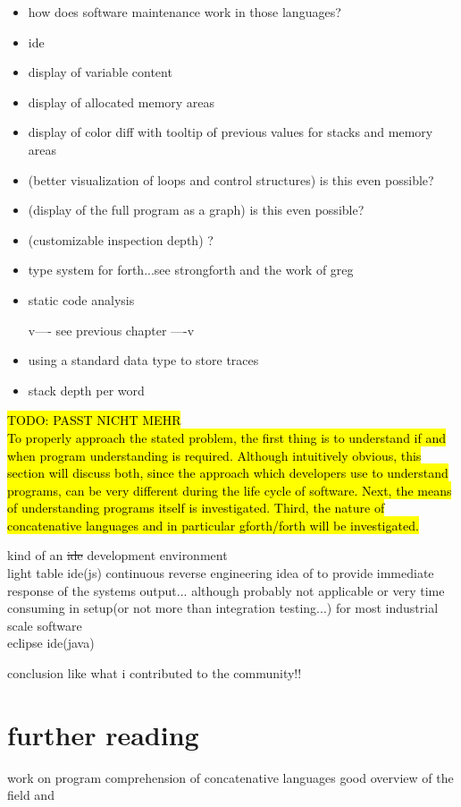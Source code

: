 \begin{itemize}
\item how does software maintenance work in those languages?
\item ide
\item display of variable content
\item display of allocated memory areas
\item display of color diff with tooltip of previous values for stacks and memory areas
\item (better visualization of loops and control structures) is this even possible?
\item (display of the full program as a graph) is this even possible?
\item (customizable inspection depth) ?
\item type system for forth...see strongforth and the work of greg

\item static code analysis

v---- see previous chapter ----v
\item using a standard data type to store traces
\item stack depth per word
\end{itemize}


\hl{TODO: PASST NICHT MEHR\\ To properly approach the stated problem, the first thing is to understand if and when program understanding is required. Although intuitively obvious, this section will discuss both, since the approach which developers use to understand programs, can be very different during the life cycle of software. Next, the means of understanding programs itself is investigated. Third, the nature of concatenative languages and in particular gforth/forth will be investigated.}

kind of an \sout{ide} development environment\\
light table ide(js) continuous reverse engineering idea of \cite{Muller:2000:RER:336512.336526} to provide immediate response of the systems output... although probably not applicable or very time consuming in setup(or not more than integration testing...) for most industrial scale software\\
eclipse ide(java)


conclusion like what i contributed to the community!!\\


\section{further reading}

work on program comprehension of concatenative languages
good overview of the field \cite{Canfora:2011:ACS:1924421.1924451} and \cite{Cornelissen2009}